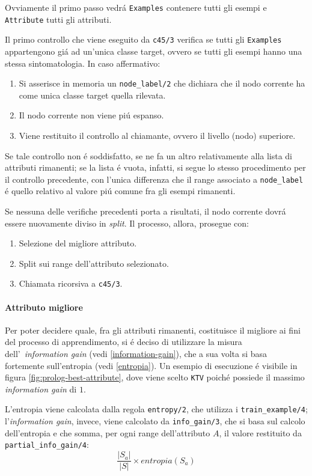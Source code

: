 \documentclass[preprint]{acm_proc_article-sp}
\begin{document}
Ovviamente il primo passo vedr\'a \verb|Examples| contenere tutti gli esempi e \verb|Attribute| tutti gli attributi.

Il primo controllo che viene eseguito da \verb|c45/3| verifica se tutti gli \verb|Examples| appartengono gi\'a ad un'unica classe target, ovvero se tutti gli esempi hanno una stessa sintomatologia. In caso affermativo:
\begin{enumerate}
\item Si asserisce in memoria un \verb|node_label/2| che dichiara che il nodo corrente ha come unica classe target quella rilevata.
\item Il nodo corrente non viene pi\'u espanso.
\item Viene restituito il controllo al chiamante, ovvero il livello (nodo) superiore.
\end{enumerate}

Se tale controllo non \'e soddisfatto, se ne fa un altro relativamente alla lista di attributi rimanenti; se la lista \'e vuota, infatti, si segue lo stesso procedimento per il controllo precedente, con l'unica differenza che il range associato a \verb|node_label| \'e quello relativo al valore pi\'u comune fra gli esempi rimanenti.

Se nessuna delle verifiche precedenti porta a risultati, il nodo corrente dovr\'a essere nuovamente diviso in \textit{split}. Il processo, allora, prosegue con:
\begin{enumerate}
\item Selezione del migliore attributo.
\item Split sui range dell'attributo selezionato.
\item Chiamata ricorsiva a \verb|c45/3|.
\end{enumerate}

\paragraph{Attributo migliore}
\label{apprendimento-attributo-migliore}
Per poter decidere quale, fra gli attributi rimanenti, costituisce il migliore ai fini del processo di apprendimento, si \'e deciso di utilizzare la misura dell'~\textit{information gain} (vedi \ref{information-gain}), che a sua volta si basa fortemente sull'entropia (vedi \ref{entropia}). Un esempio di esecuzione \'e visibile in figura \ref{fig:prolog-best-attribute}, dove viene scelto \verb|KTV| poich\'e possiede il massimo \textit{information gain} di $1$.

L'entropia viene calcolata dalla regola \verb|entropy/2|, che utilizza i \verb|train_example/4|; l'\textit{information gain}, invece, viene calcolato da \verb|info_gain/3|, che si basa sul calcolo dell'entropia e che somma, per ogni range dell'attributo $A$, il valore restituito da \verb|partial_info_gain/4|:
\[\frac{|S_a|}{|S|} \times entropia(S_a)\]
\end{document}
